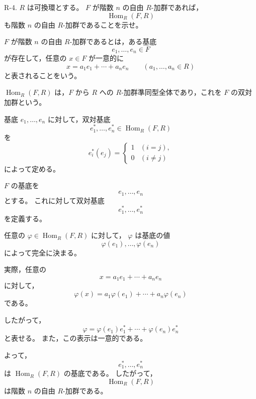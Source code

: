 
\begin{exercise}
	R-4. $R$ は可換環とする。
	$F$ が階数 $n$ の自由 $R$-加群であれば，
	\[
	\operatorname{Hom}_R(F,R)
	\]
	も階数 $n$ の自由 $R$-加群であることを示せ。
\end{exercise}

\begin{background}
	$F$ が階数 $n$ の自由 $R$-加群であるとは，ある基底
	\[
	e_1,\dots,e_n\in F
	\]
	が存在して，任意の $x\in F$ が一意的に
	\[
	x=a_1e_1+\cdots+a_ne_n
	\qquad
	(a_1,\dots,a_n\in R)
	\]
	と表されることをいう。
	
	$\operatorname{Hom}_R(F,R)$ は，$F$ から $R$ への
	$R$-加群準同型全体であり，これを $F$ の双対加群という。
	
	基底 $e_1,\dots,e_n$ に対して，双対基底
	\[
	e_1^\ast,\dots,e_n^\ast\in\operatorname{Hom}_R(F,R)
	\]
	を
	\[
	e_i^\ast(e_j)=
	\begin{cases}
		1 & (i=j),\\
		0 & (i\neq j)
	\end{cases}
	\]
	によって定める。
\end{background}

\begin{strategy}
	$F$ の基底を
	\[
	e_1,\dots,e_n
	\]
	とする。
	これに対して双対基底
	\[
	e_1^\ast,\dots,e_n^\ast
	\]
	を定義する。
	
	任意の $\varphi\in\operatorname{Hom}_R(F,R)$ に対して，
	$\varphi$ は基底の値
	\[
	\varphi(e_1),\dots,\varphi(e_n)
	\]
	によって完全に決まる。
	
	実際，任意の
	\[
	x=a_1e_1+\cdots+a_ne_n
	\]
	に対して，
	\[
	\varphi(x)
	=
	a_1\varphi(e_1)+\cdots+a_n\varphi(e_n)
	\]
	である。
	
	したがって，
	\[
	\varphi
	=
	\varphi(e_1)e_1^\ast+\cdots+\varphi(e_n)e_n^\ast
	\]
	と表せる。
	また，この表示は一意的である。
	
	よって，
	\[
	e_1^\ast,\dots,e_n^\ast
	\]
	は $\operatorname{Hom}_R(F,R)$ の基底である。
	したがって，
	\[
	\operatorname{Hom}_R(F,R)
	\]
	は階数 $n$ の自由 $R$-加群である。
\end{strategy}